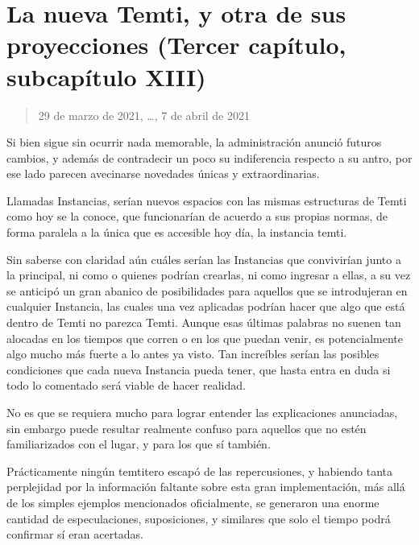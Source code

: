\documentclass[
  spanish,
]{book}
\begin{document}
\hypertarget{la-nueva-temti-y-otra-de-sus-proyecciones-tercer-capuxedtulo-subcapuxedtulo-xiii}{%
\section{La nueva Temti, y otra de sus proyecciones (Tercer capítulo, subcapítulo XIII)}\label{la-nueva-temti-y-otra-de-sus-proyecciones-tercer-capuxedtulo-subcapuxedtulo-xiii}}

\begin{quote}
29 de marzo de 2021, \ldots, 7 de abril de 2021
\end{quote}

Si bien sigue sin ocurrir nada memorable, la administración anunció futuros cambios, y además de contradecir un poco su indiferencia respecto a su antro, por ese lado parecen avecinarse novedades únicas y extraordinarias.

Llamadas Instancias, serían nuevos espacios con las mismas estructuras de Temti como hoy se la conoce, que funcionarían de acuerdo a sus propias normas, de forma paralela a la única que es accesible hoy día, la instancia temti.

Sin saberse con claridad aún cuáles serían las Instancias que convivirían junto a la principal, ni como o quienes podrían crearlas, ni como ingresar a ellas, a su vez se anticipó un gran abanico de posibilidades para aquellos que se introdujeran en cualquier Instancia, las cuales una vez aplicadas podrían hacer que algo que está dentro de Temti no parezca Temti. Aunque esas últimas palabras no suenen tan alocadas en los tiempos que corren o en los que puedan venir, es potencialmente algo mucho más fuerte a lo antes ya visto. Tan increíbles serían las posibles condiciones que cada nueva Instancia pueda tener, que hasta entra en duda si todo lo comentado será viable de hacer realidad.

No es que se requiera mucho para lograr entender las explicaciones anunciadas, sin embargo puede resultar realmente confuso para aquellos que no estén familiarizados con el lugar, y para los que sí también.

Prácticamente ningún temtitero escapó de las repercusiones, y habiendo tanta perplejidad por la información faltante sobre esta gran implementación, más allá de los simples ejemplos mencionados oficialmente, se generaron una enorme cantidad de especulaciones, suposiciones, y similares que solo el tiempo podrá confirmar sí eran acertadas.
\end{document}
